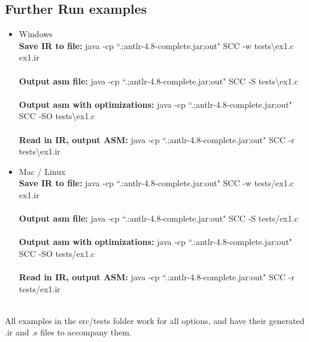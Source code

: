 \documentclass{article}
\begin{document}
\subsection{Further Run examples}
\begin{itemize}
	\item Windows \\
		{\bf Save IR to file:} java -cp ``.;antlr-4.8-complete.jar;out" SCC -w tests\textbackslash ex1.c ex1.ir\\\\
		{\bf Output asm file:} java -cp ``.;antlr-4.8-complete.jar;out" SCC -S tests\textbackslash ex1.c\\\\
		{\bf Output asm with optimizations:} java -cp ``.;antlr-4.8-complete.jar;out" SCC -SO tests\textbackslash ex1.c\\\\
		{\bf Read in IR, output ASM:} java -cp ``.;antlr-4.8-complete.jar;out" SCC -r tests\textbackslash ex1.ir\\
	\item Mac / Linux \\
		{\bf Save IR to file:} java -cp ``.:antlr-4.8-complete.jar:out" SCC -w tests/ex1.c ex1.ir\\\\
		{\bf Output asm file:} java -cp ``.:antlr-4.8-complete.jar:out" SCC -S tests/ex1.c\\\\		
		{\bf Output asm with optimizations:} java -cp ``.:antlr-4.8-complete.jar:out" SCC -SO tests/ex1.c\\\\
		{\bf Read in IR, output ASM:} java -cp ``.:antlr-4.8-complete.jar:out" SCC -r tests/ex1.ir\\\\
\end{itemize}

All examples in the src/tests folder work for all options, and have their generated .ir and .s files to accompany them.
\end{document}
